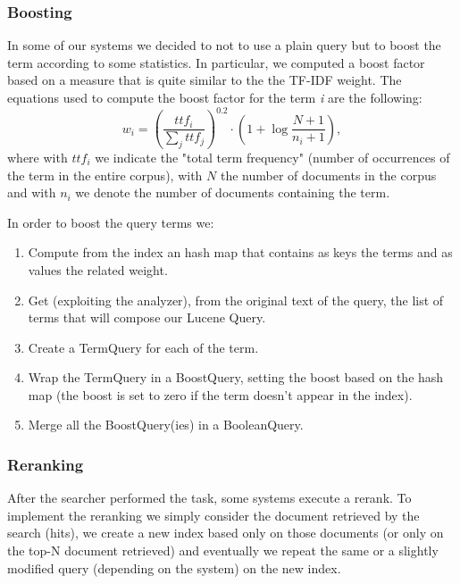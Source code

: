 \subsubsection{Boosting}
\label{subsub:boost}
In some of our systems we decided to not to use a plain query but to boost the term according to some statistics. In particular, we computed a boost factor based on a measure that is quite similar to the the TF-IDF weight. The equations used to compute the boost factor for the term \textit{i} are the following:
\begin{equation}
 w_i={\left(\frac{ttf_i}{\sum_{j} ttf_j}\right)}^{0.2} \cdot \left(1+\log \frac{N+1}{n_i+1} \right),
\end{equation}
where with $ttf_i$ we indicate the "total term frequency" (number of occurrences of the term in the entire corpus), with $N$ the number of documents in the corpus and with $n_i$ we denote the number of documents containing the term.

\par
In order to boost the query terms we:
\begin{enumerate}
    \item Compute from the index an hash map that contains as keys the terms and as values the related weight.
    \item Get (exploiting the analyzer), from the original text of the query, the list of terms that will compose our Lucene Query.
    \item Create a TermQuery for each of the term.
    \item Wrap the TermQuery in a BoostQuery, setting the boost based on the hash map (the boost is set to zero if the term doesn't appear in the index).
    \item Merge all the BoostQuery(ies) in a BooleanQuery.
\end{enumerate}


\subsubsection{Reranking}
\label{subsub:rerank}
After the searcher performed the task, some systems execute a rerank. To implement the reranking we simply consider the document retrieved by the search (hits), we create a new index based only on those documents (or only on the top-N document retrieved) and eventually we repeat the same or a slightly modified query (depending on the system) on the new index.


